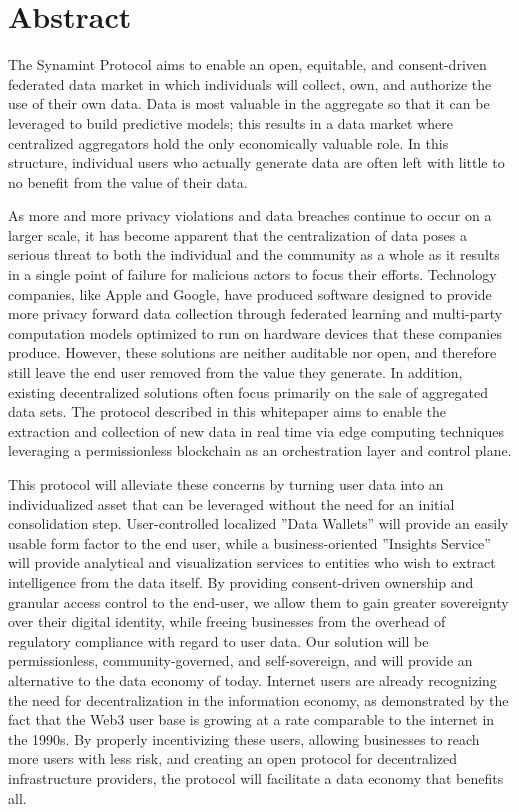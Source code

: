 \section{Abstract}

The Synamint Protocol aims to enable an open, equitable, and consent-driven federated data market in which individuals will 
collect, own, and authorize the use of their own data. Data is most valuable in the aggregate so that 
it can be leveraged to build predictive models; this results in a data market where centralized aggregators hold 
the only economically valuable role. In this structure, individual users who actually generate data are often 
left with little to no benefit from the value of their data. 

As more and more privacy violations and data breaches continue to occur on a larger scale, it has become apparent that the
centralization of data poses a serious threat to both the individual and the community as a whole as it results in a
single point of failure for malicious actors to focus their efforts. Technology companies, like Apple and Google, have
produced software designed to provide more privacy forward data collection through federated learning and multi-party 
computation models optimized to run on hardware devices that these companies produce. However, these solutions are 
neither auditable nor open, and therefore still leave the end user removed from the value they generate. In addition, 
existing decentralized solutions often focus primarily on the sale of aggregated data sets. The protocol described in this 
whitepaper aims to enable the extraction and collection of new data in real time via edge computing techniques leveraging
a permissionless blockchain as an orchestration layer and control plane. 

This protocol will alleviate these concerns by turning user data into an individualized asset that can be leveraged 
without the need for an initial consolidation step. User-controlled localized ”Data Wallets” will provide an easily usable form 
factor to the end user, while a business-oriented ”Insights Service” will provide analytical and visualization services to entities who wish to extract 
intelligence from the data itself. By providing consent-driven ownership and granular access control to the end-user, we allow them to gain greater sovereignty over their 
digital identity, while freeing businesses from the overhead of regulatory compliance with regard to user data. Our solution will be 
permissionless, community-governed, and self-sovereign, and will provide an alternative to the data economy of today. Internet users 
are already recognizing the need for decentralization in the information economy, as demonstrated by the fact that the Web3 user base 
is growing at a rate comparable to the internet in the 1990s. By properly incentivizing these users, allowing businesses to reach more 
users with less risk, and creating an open protocol for decentralized infrastructure providers, the protocol will facilitate 
a data economy that benefits all. 